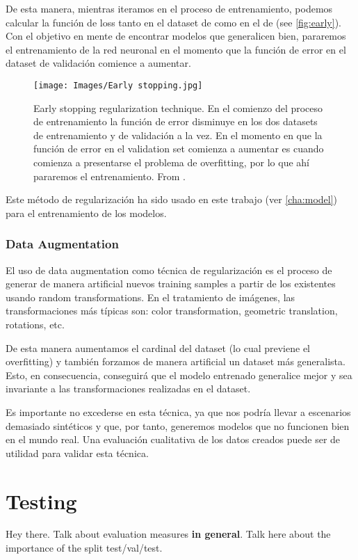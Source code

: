 De esta manera, mientras iteramos en el proceso de entrenamiento, podemos
calcular la función de loss tanto en el dataset de  como en el de
 (see \vref{fig:early}). Con el objetivo en mente de encontrar
modelos que generalicen bien, pararemos el entrenamiento de la red neuronal en
el momento que la función de error en el dataset de validación comience a
aumentar.

\begin{figure}[ht]
  \centering
  \texttt{[image: Images/Early stopping.jpg]}
  \caption[Early stopping regularization technique]{Early stopping
    regularization technique. En el comienzo del proceso de entrenamiento la
    función de error disminuye en los dos datasets de entrenamiento y de
    validación a la vez. En el momento en que la función de error en el
    validation set comienza a aumentar es cuando comienza a presentarse el
    problema de overfitting, por lo que ahí pararemos el entrenamiento. From
    .}\label{fig:early}
\end{figure}

Este método de regularización ha sido usado en este trabajo (ver
\vref{cha:model}) para el entrenamiento de los modelos.

\subsubsection{Data Augmentation}
El uso de data augmentation como técnica de regularización es el proceso de
generar de manera artificial nuevos training samples a partir de los existentes
usando random transformations. En el tratamiento de imágenes, las
transformaciones más típicas son: color transformation, geometric translation,
rotations, etc.

De esta manera aumentamos el cardinal del dataset (lo cual previene el
overfitting) y también forzamos de manera artificial un dataset más
generalista. Esto, en consecuencia, conseguirá que el modelo entrenado
generalice mejor y sea invariante a las transformaciones realizadas en el
dataset.

\begin{remarkBox}
  Es importante no excederse en esta técnica, ya que nos podría llevar a
  escenarios demasiado sintéticos y que, por tanto, generemos modelos que no
  funcionen bien en el mundo real. Una evaluación cualitativa de los datos
  creados puede ser de utilidad para validar esta técnica.
\end{remarkBox}


\section{Testing}
Hey there. Talk about evaluation measures \textbf{in general}. Talk here about
the importance of the split test/val/test.
